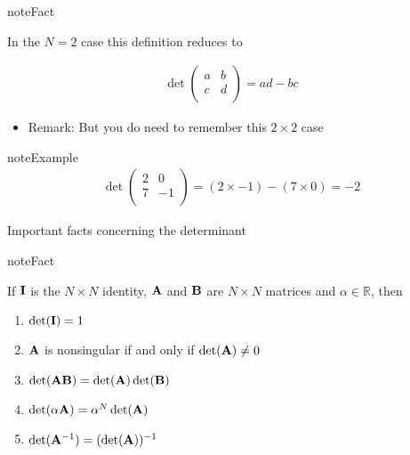 \documentclass[letterpaper,10pt,english]{jupyterBook}
\begin{document}
\begin{sphinxadmonition}{note}{Fact}

\sphinxAtStartPar
In the \(N = 2\) case this definition reduces to
\end{sphinxadmonition}
\begin{equation*}
\begin{split}
%
\det 
\left(
\begin{array}{cc}
a & b \\
c & d \\
\end{array}
\right)
= ad - bc
%
\end{split}
\end{equation*}\begin{itemize}
\item {} 
\sphinxAtStartPar
Remark: But you do need to remember this \(2 \times 2\) case

\end{itemize}

\begin{sphinxadmonition}{note}{Example}
\begin{equation*}
\begin{split}
%
\det 
\left(
\begin{array}{cc}
2 & 0 \\
7 & -1 \\
\end{array}
\right)
= (2 \times -1) - (7 \times 0) = -2
%
\end{split}
\end{equation*}\end{sphinxadmonition}

\sphinxAtStartPar
Important facts concerning the determinant

\begin{sphinxadmonition}{note}{Fact}

\sphinxAtStartPar
If \({\bf I}\) is the \(N \times N\) identity, \({\bf A}\) and \({\bf B}\) are \(N \times N\) matrices and \(\alpha \in \mathbb{R}\), then
\begin{enumerate}
%
\item {} 
\sphinxAtStartPar
\(\det({\bf I}) = 1\)

\item {} 
\sphinxAtStartPar
\({\bf A}\) is nonsingular if and only if \(\det({\bf A})
\ne 0\)

\item {} 
\sphinxAtStartPar
\(\det({\bf A}{\bf B}) = \det({\bf A})
\det({\bf B})\)

\item {} 
\sphinxAtStartPar
\(\det(\alpha {\bf A}) = \alpha^N \det({\bf A})\)

\item {} 
\sphinxAtStartPar
\(\det({\bf A}^{-1}) = (\det({\bf A}))^{-1}\)

\end{enumerate}
\end{sphinxadmonition}
\end{document}
